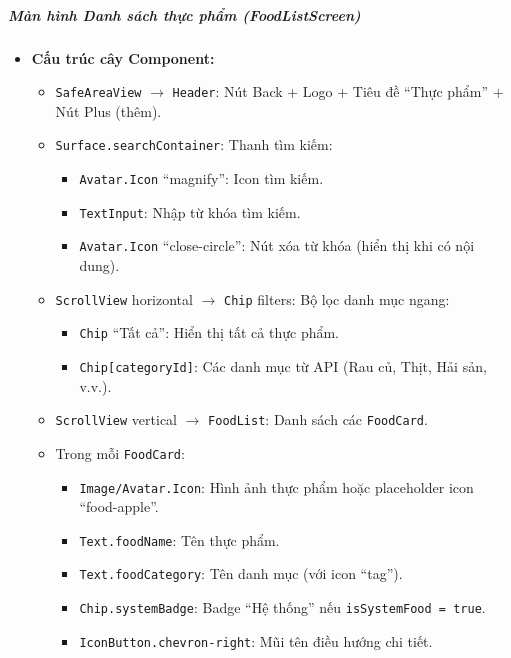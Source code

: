 \subparagraph{Màn hình Danh sách thực phẩm (FoodListScreen)}
\begin{itemize}
    \item \textbf{Cấu trúc cây Component:}
        \begin{itemize}
            \item \texttt{SafeAreaView} $\rightarrow$ \texttt{Header}: Nút Back + Logo + Tiêu đề ``Thực phẩm'' + Nút Plus (thêm).
            \item \texttt{Surface.searchContainer}: Thanh tìm kiếm:
                \begin{itemize}
                    \item \texttt{Avatar.Icon} ``magnify'': Icon tìm kiếm.
                    \item \texttt{TextInput}: Nhập từ khóa tìm kiếm.
                    \item \texttt{Avatar.Icon} ``close-circle'': Nút xóa từ khóa (hiển thị khi có nội dung).
                \end{itemize}
            \item \texttt{ScrollView} horizontal $\rightarrow$ \texttt{Chip} filters: Bộ lọc danh mục ngang:
                \begin{itemize}
                    \item \texttt{Chip} ``Tất cả'': Hiển thị tất cả thực phẩm.
                    \item \texttt{Chip[categoryId]}: Các danh mục từ API (Rau củ, Thịt, Hải sản, v.v.).
                \end{itemize}
            \item \texttt{ScrollView} vertical $\rightarrow$ \texttt{FoodList}: Danh sách các \texttt{FoodCard}.
            \item Trong mỗi \texttt{FoodCard}:
                \begin{itemize}
                    \item \texttt{Image/Avatar.Icon}: Hình ảnh thực phẩm hoặc placeholder icon ``food-apple''.
                    \item \texttt{Text.foodName}: Tên thực phẩm.
                    \item \texttt{Text.foodCategory}: Tên danh mục (với icon ``tag'').
                    \item \texttt{Chip.systemBadge}: Badge ``Hệ thống'' nếu \texttt{isSystemFood = true}.
                    \item \texttt{IconButton.chevron-right}: Mũi tên điều hướng chi tiết.
                \end{itemize}

\end{itemize}
\end{itemize}
